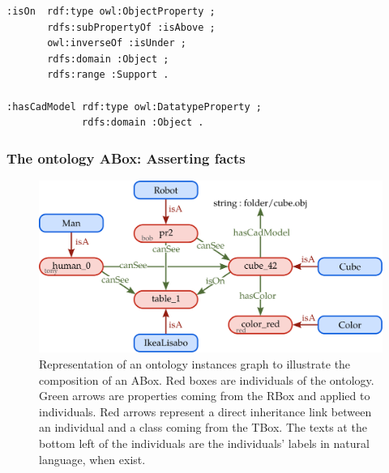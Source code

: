 \begin{lstlisting}[frame=single, basicstyle=\scriptsize\ttfamily, label={lst:Rbox}, caption={Description of ontology properties in the OWL language using the Turle syntax.},captionpos=b, style=OwlTurtle]
:isOn  rdf:type owl:ObjectProperty ;
       rdfs:subPropertyOf :isAbove ;
       owl:inverseOf :isUnder ;
       rdfs:domain :Object ;
       rdfs:range :Support .

:hasCadModel rdf:type owl:DatatypeProperty ;
             rdfs:domain :Object .
\end{lstlisting}

\subsubsection{The ontology ABox: Asserting facts}

\begin{figure}[ht!]
\centering
\includegraphics[scale=0.4]{figures/chapter2/Abox.png}
\caption{\label{fig:Abox}  Representation of an ontology instances graph to illustrate the composition of an ABox. Red boxes are individuals of the ontology. Green arrows are properties coming from the RBox and applied to individuals. Red arrows represent a direct inheritance link between an individual and a class coming from the TBox. The texts at the bottom left of the individuals are the individuals' labels in natural language, when exist.}
\end{figure}

